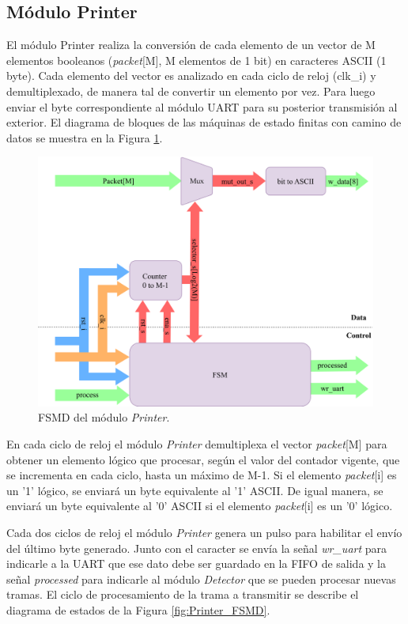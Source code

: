 \subsection{Módulo Printer}

El módulo Printer realiza la conversión de cada elemento de un vector de M elementos booleanos (\textit{packet}[M], M elementos de 1 bit) en caracteres ASCII (1 byte). Cada elemento del vector es analizado en cada ciclo de reloj (clk\_i) y demultiplexado, de manera tal de convertir un elemento por vez. Para luego enviar el byte correspondiente al módulo UART para su posterior transmisión al exterior. El diagrama de bloques de las máquinas de estado finitas con camino de datos se muestra en la Figura \ref{fig:Printer_module}.

\begin{figure}[H]
	\centering
	\includegraphics[width=1\textwidth]{Figuras/Printer_module.png}
	\centering\caption{FSMD del módulo \textit{Printer}.}
	\label{fig:Printer_module}
\end{figure}

En cada ciclo de reloj el módulo \textit{Printer} demultiplexa el vector \textit{packet}[M] para obtener un elemento lógico que procesar, según el valor del contador vigente, que se incrementa en cada ciclo, hasta un máximo de M-1. Si el elemento \textit{packet}[i] es un '1' lógico, se enviará un byte equivalente al '1' ASCII. De igual manera, se enviará un byte equivalente al '0' ASCII si el elemento \textit{packet}[i] es un '0' lógico.

Cada dos ciclos de reloj el módulo \textit{Printer} genera un pulso para habilitar el envío del último byte generado. Junto con el caracter se envía la señal \textit{wr\_uart} para indicarle a la UART que ese dato debe ser guardado en la FIFO de salida y la señal \textit{processed} para indicarle al módulo \textit{Detector} que se pueden procesar nuevas tramas. El ciclo de procesamiento de la trama a transmitir se describe el diagrama de estados de la Figura \ref{fig:Printer_FSMD}.

